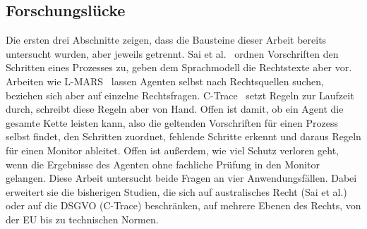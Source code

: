 \subsection{Forschungslücke}
Die ersten drei Abschnitte zeigen, dass die Bausteine dieser Arbeit bereits untersucht wurden, aber jeweils getrennt.
Sai et al.~\cite{sai2024} ordnen Vorschriften den Schritten eines Prozesses zu, geben dem Sprachmodell die Rechtstexte aber vor.
Arbeiten wie L-MARS~\cite{yuan2025} lassen Agenten selbst nach Rechtsquellen suchen, beziehen sich aber auf einzelne Rechtsfragen.
C-Trace~\cite{kahani2026} setzt Regeln zur Laufzeit durch, schreibt diese Regeln aber von Hand.
Offen ist damit, ob ein Agent die gesamte Kette leisten kann, also die geltenden Vorschriften für einen Prozess selbst findet, den Schritten zuordnet, fehlende Schritte erkennt und daraus Regeln für einen Monitor ableitet.
Offen ist außerdem, wie viel Schutz verloren geht, wenn die Ergebnisse des Agenten ohne fachliche Prüfung in den Monitor gelangen.
Diese Arbeit untersucht beide Fragen an vier Anwendungsfällen.
Dabei erweitert sie die bisherigen Studien, die sich auf australisches Recht (Sai et al.) oder auf die DSGVO (C-Trace) beschränken, auf mehrere Ebenen des Rechts, von der EU bis zu technischen Normen.
